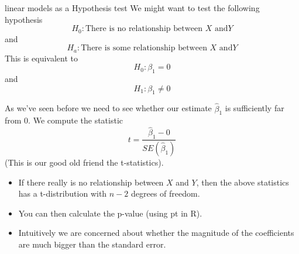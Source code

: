 \documentclass{bredelebeamer}
\begin{document}
\begin{frame}{linear models as a Hypothesis test}
We might want to test the following hypothesis
\begin{equation}
H_0: \text{There is no relationship between } X \text{ and} Y 
\end{equation}
and
\begin{equation}
H_a: \text{There is some relationship between } X \text{ and} Y 
\end{equation}
This is equivalent to 
\begin{equation}
H_0: \beta_1 = 0
\end{equation}
and
\begin{equation}
H_1: \beta_1 \neq 0
\end{equation}
\end{frame}

\begin{frame}
As we've seen before we need to see whether our estimate $\hat{\beta}_1$ is sufficiently far from $0$. We compute the statistic
\begin{equation}
t = \frac{\hat{\beta}_1 - 0 }{SE(\hat{\beta}_1)}
\end{equation}
(This is our good old friend the t-statistics).
\\
\begin{block}
	
\begin{itemize}
\item If there really is no relationship between $X$ and $Y$, then the above statistics has a t-distribution with $n - 2$ degrees of freedom.
\item You can then calculate the p-value (using pt in R).
\item Intuitively we are concerned about whether the magnitude of the coefficients are much bigger than the standard error.
\end{itemize}
\end{block}
\end{frame}
\end{document}
